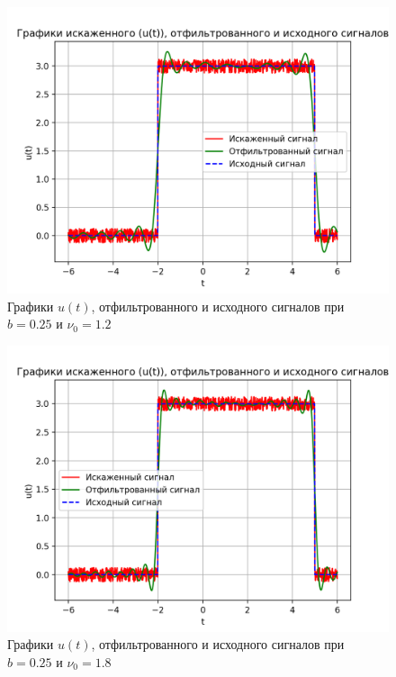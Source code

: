 \begin{figure}[ht!]
    \centering
    \includegraphics[scale=0.85]{media/1 task/high_freq/Cleaned_0,25_-1,1981981981981982.png}
    \caption{Графики  $u(t)$, отфильтрованного и исходного сигналов при $b=0.25$ и $\nu_0=1.2$}
    \label{fig:cleaned_025_12}
\end{figure}

\clearpage

\begin{figure}[ht!]
    \centering
    \includegraphics[scale=0.85]{media/1 task/high_freq/Cleaned_0,25_-1,7987987987987988.png}
    \caption{Графики  $u(t)$, отфильтрованного и исходного сигналов при $b=0.25$ и $\nu_0=1.8$}
    \label{fig:cleaned_025_18}
\end{figure}

